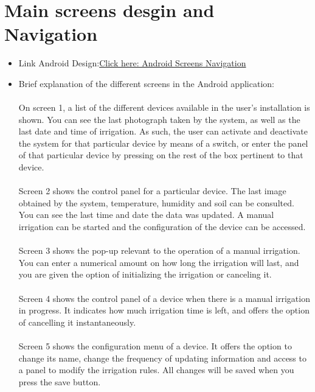 \documentclass[11pt,a4paper]{article}
\begin{document}
\section{Main screens desgin and Navigation}
\begin{itemize}
\item Link Android Design:\newline\newline \textcolor{blue}{\href{https://drive.google.com/file/d/1GWvJHmUxLQVg-ns894TZreQi0Cy9rv79/view?usp=sharing}{Click here: Android Screens Navigation}}

\item Brief explanation of the different screens in the Android application: 
\\ \\
On screen 1, a list of the different devices available in the user's installation is shown. You can see the last photograph taken by the system, as well as the last date and time of irrigation. As such, the user can activate and deactivate the system for that particular device by means of a switch, or enter the panel of that particular device by pressing on the rest of the box pertinent to that device. 
\\ \\
Screen 2 shows the control panel for a particular device. The last image obtained by the system, temperature, humidity and soil can be consulted. 
You can see the last time and date the data was updated. A manual irrigation can be started and the configuration of the device can be accessed.
\\ \\
Screen 3 shows the pop-up relevant to the operation of a manual irrigation. You can enter a numerical amount on how long the irrigation will last, and you are given the option of initializing the irrigation or canceling it.
\\ \\
Screen 4 shows the control panel of a device when there is a manual irrigation in progress. It indicates how much irrigation time is left, and offers the option of cancelling it instantaneously. 
\\ \\
Screen 5 shows the configuration menu of a device. It offers the option to change its name, change the frequency of updating information and access to a panel to modify the irrigation rules. All changes will be saved when you press the save button. 
\\ \\

\end{itemize}
\end{document}
